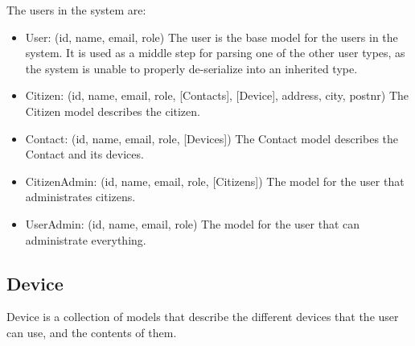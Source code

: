 The users in the system are:
\begin{itemize}
    \item User: (id, name, email, role) \newline
    The user is the base model for the users in the system. It is used as a middle step for parsing one of the other user types, as the system is unable to properly de-serialize into an inherited type.
    \item Citizen: (id, name, email, role, [Contacts], [Device], address, city, postnr) \newline
    The Citizen model describes the citizen.  
    \item Contact: (id, name, email, role, [Devices]) \newline
    The Contact model describes the Contact and its devices.
    \item CitizenAdmin: (id, name, email, role, [Citizens]) \newline
    The model for the user that administrates citizens.
    \item UserAdmin: (id, name, email, role) \newline
    The model for the user that can administrate everything.
\end{itemize}


\subsection{Device}
Device is a collection of models that describe the different devices that the user can use, and the contents of them.

